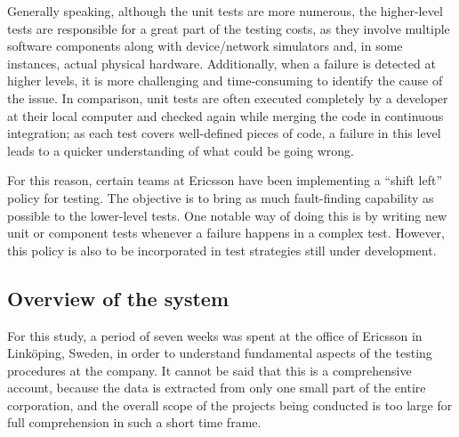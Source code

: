 Generally speaking, although the unit tests are more numerous, the higher-level tests are responsible for a great part of the testing costs, as they involve multiple software components along with device/network simulators and, in some instances, actual physical hardware.
Additionally, when a failure is detected at higher levels, it is more challenging and time-consuming to identify the cause of the issue.
In comparison, unit tests are often executed completely by a developer at their local computer and checked again while merging the code in continuous integration; as each test covers well-defined pieces of code, a failure in this level leads to a quicker understanding of what could be going wrong.

For this reason, certain teams at Ericsson have been implementing a ``shift left'' policy for testing.
The objective is to bring as much fault-finding capability as possible to the lower-level tests.
One notable way of doing this is by writing new unit or component tests whenever a failure happens in a complex test.
However, this policy is also to be incorporated in test strategies still under development.



%





\subsection{Overview of the system}

For this study, a period of seven weeks was spent at the office of Ericsson in Linköping, Sweden, in order to understand fundamental aspects of the testing procedures at the company.
It cannot be said that this is a comprehensive account, because the data is extracted from only one small part of the entire corporation, and the overall scope of the projects being conducted is too large for full comprehension in such a short time frame.

